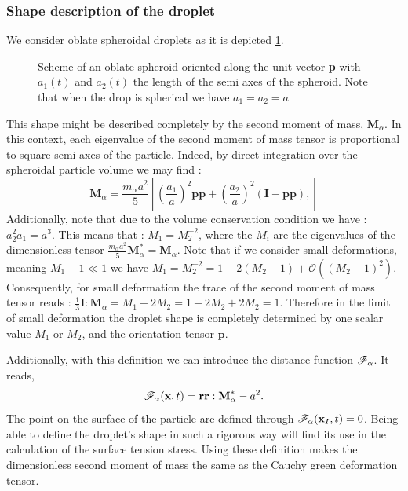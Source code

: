 \subsubsection{Shape description of the droplet}
We consider oblate spheroidal droplets as it is depicted \ref{fig:scheme_spheroid}. 
\begin{figure}[h!]
    \centering
    \hfill
    \hfill
    \caption{Scheme of an  oblate spheroid oriented along the unit vector \textbf{p} with $a_1(t)$ and $a_2(t)$ the length of the semi axes of the spheroid.
    Note that when the drop is spherical we have $a_1=a_2=a$}
    \label{fig:scheme_spheroid}
\end{figure}
This shape might be described completely by the second moment of mass, $\textbf{M}_\alpha$.
In this context, each eigenvalue of the second moment of mass tensor is proportional to square semi axes of the particle. 
Indeed, by direct integration over the spheroidal particle volume we may find :
\begin{equation*}
    \textbf{M}_\alpha
    = \frac{m_\alpha a^2}{5}\left[
        \left(\frac{a_1}{a}\right)^2\textbf{pp}
        + \left(\frac{a_2}{a}\right)^2 (\textbf{I} - \textbf{pp}),
    \right] 
\end{equation*}
Additionally, note that due to the volume conservation condition we have : $ a_2^2 a_1 = a^3$. 
This means that : $M_1 = M_2^{-2}$, where the $M_i$ are the eigenvalues of the dimensionless tensor $\frac{m_\alpha a^2}{5}\textbf{M}_\alpha^* = \textbf{M}_\alpha$. 
Note that if we consider small deformations, meaning $M_1 - 1 \ll 1$ we have $M_1  = M_2^{-2} = 1 - 2 (M_2 - 1) + \mathcal{O}((M_2 -1)^2)$. 
Consequently, for small deformation the trace of the second moment of mass tensor reads :  $\frac{1}{3}\textbf{I}:\textbf{M}_\alpha = M_1 + 2M_2 = 1 - 2M_2 + 2M_2 = 1$. 
Therefore in the limit of small deformation the droplet shape is completely determined by one scalar value $M_1$ or $M_2$, and the orientation tensor $\textbf{p}$. 

Additionally, with this definition we can introduce the distance function  $\mathscr{F}_\alpha$. 
It reads, 
\begin{equation*}
    \mathscr{F}_\alpha(\textbf{x},t) = \textbf{rr}:\textbf{M}_\alpha^* -a^2.  
    \label{eq:distance_function}
\end{equation*}
The point on the surface of the particle are defined through $\mathscr{F}_\alpha(\textbf{x}_I,t) = 0$. 
Being able to define the droplet's shape in such a rigorous way will find its use in the calculation of the surface tension stress. 
Using these definition makes the dimensionless  second moment of mass the same as the Cauchy green deformation tensor. 

